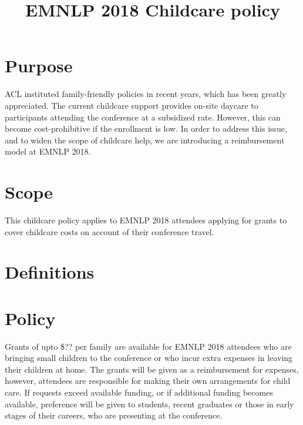 \documentclass[11pt,letterpaper]{article}
\title{EMNLP 2018 Childcare policy}
\begin{document}
\maketitle

\section*{Purpose} 
ACL instituted family-friendly policies in recent years, which has been greatly appreciated. 
 The current childcare support provides on-site daycare to participants attending the conference at a subsidized rate. However, this can become cost-prohibitive if the enrollment is low. 
  In order to address this issue, and to widen the scope of childcare help, we are introducing a reimbursement model at EMNLP 2018.  

\section*{Scope}
This childcare policy applies to EMNLP 2018 attendees applying for grants to cover childcare costs on account of their conference travel. 


\section*{Definitions}


\section*{Policy}

Grants of upto \$??  per family are available for EMNLP 2018 attendees who are bringing small children to the conference or who incur extra expenses in leaving their children at home. 
The grants will be given as a reimbursement for expenses, however, attendees are responsible for making their own arrangements for child care. If requests exceed available funding, or if additional funding becomes available, preference will be given to students,  recent graduates or those in early stages of their careers,  who are presenting at the conference.
\end{document}
